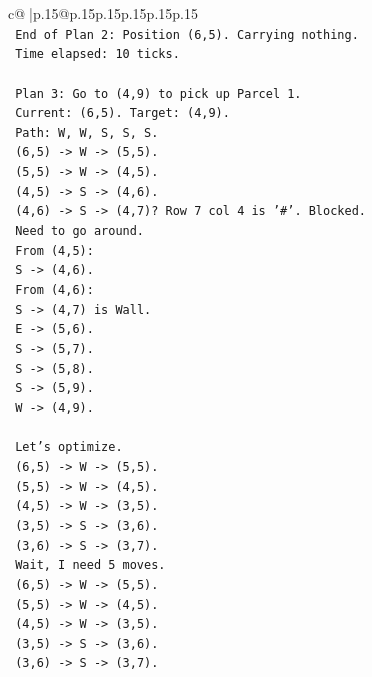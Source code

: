 \documentclass{article}
\begin{document}
{\begin{supertabular}{c@{$\;$}|p{.15\linewidth}@{}p{.15\linewidth}p{.15\linewidth}p{.15\linewidth}p{.15\linewidth}p{.15\linewidth}}
{{{\\ 
\texttt{      End of Plan 2: Position (6,5). Carrying nothing.} \\
\texttt{      Time elapsed: 10 ticks.} \\
\\ 
\texttt{      Plan 3: Go to (4,9) to pick up Parcel 1.} \\
\texttt{      Current: (6,5). Target: (4,9).} \\
\texttt{      Path: W, W, S, S, S.} \\
\texttt{      (6,5) {-}> W {-}> (5,5).} \\
\texttt{      (5,5) {-}> W {-}> (4,5).} \\
\texttt{      (4,5) {-}> S {-}> (4,6).} \\
\texttt{      (4,6) {-}> S {-}> (4,7)? Row 7 col 4 is '\#'. Blocked.} \\
\texttt{      Need to go around.} \\
\texttt{      From (4,5):} \\
\texttt{      S {-}> (4,6).} \\
\texttt{      From (4,6):} \\
\texttt{      S {-}> (4,7) is Wall.} \\
\texttt{      E {-}> (5,6).} \\
\texttt{      S {-}> (5,7).} \\
\texttt{      S {-}> (5,8).} \\
\texttt{      S {-}> (5,9).} \\
\texttt{      W {-}> (4,9).} \\
\\ 
\texttt{      Let's optimize.} \\
\texttt{      (6,5) {-}> W {-}> (5,5).} \\
\texttt{      (5,5) {-}> W {-}> (4,5).} \\
\texttt{      (4,5) {-}> W {-}> (3,5).} \\
\texttt{      (3,5) {-}> S {-}> (3,6).} \\
\texttt{      (3,6) {-}> S {-}> (3,7).} \\
\texttt{      Wait, I need 5 moves.} \\
\texttt{      (6,5) {-}> W {-}> (5,5).} \\
\texttt{      (5,5) {-}> W {-}> (4,5).} \\
\texttt{      (4,5) {-}> W {-}> (3,5).} \\
\texttt{      (3,5) {-}> S {-}> (3,6).} \\
\texttt{      (3,6) {-}> S {-}> (3,7).} \\
}}}
\end{supertabular}}
\end{document}
